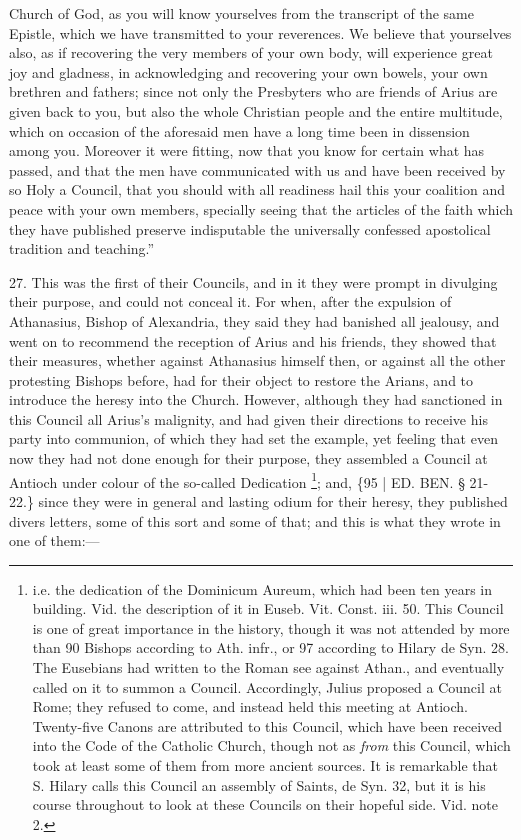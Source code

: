 Church of God, as you will know yourselves from the transcript of the
same Epistle, which we have transmitted to your reverences. We believe
that yourselves also, as if recovering the very members of your
own body, will experience great joy and gladness, in acknowledging and
recovering your own bowels, your own brethren and fathers; since not
only the Presbyters who are friends of Arius are given back to you,
but also the whole Christian people and the entire multitude, which on
occasion of the aforesaid men have a long time been in dissension
among you. Moreover it were fitting, now that you know for certain
what has passed, and that the men have communicated with us and have
been received by so Holy a Council, that you should with all readiness
hail this your coalition and peace with your own members, specially
seeing that the articles of the faith which they have published
preserve indisputable the universally confessed apostolical tradition
and teaching.''

27. This was the first of
their Councils, and in it they were prompt in divulging their purpose,
and could not conceal it. For when, after the expulsion of Athanasius,
Bishop of Alexandria, they said they had banished all jealousy, and
went on to recommend the reception of Arius and his friends, they
showed that their measures, whether against Athanasius himself then,
or against all the other protesting Bishops before, had for their
object to restore the Arians, and to introduce the heresy into the
Church. However, although they had sanctioned in this Council all
Arius's malignity, and had given their directions to receive his party
into communion, of which they had set the example, yet feeling that
even now they had not done enough for their purpose, they assembled a
Council at Antioch under colour of the so-called Dedication \footnote{i.e. the dedication of the Dominicum Aureum, which had been ten years
in building. Vid. the description of it in Euseb. Vit. Const. iii. 50.
This Council is one of great importance in the history, though it was
not attended by more than 90 Bishops according to Ath. infr., or 97
according to Hilary de Syn. 28. The Eusebians had written to the Roman
see against Athan., and eventually called on it to summon a Council.
Accordingly, Julius proposed a Council at Rome; they refused to come,
and instead held this meeting at Antioch. Twenty-five Canons are
attributed to this Council, which have been received into the Code of
the Catholic Church, though not as \emph{from} this Council, which
took at least some of them from more ancient sources. It is remarkable
that S. Hilary calls this Council an assembly of Saints, de Syn. 32,
but it is his course throughout to look at these Councils on their
hopeful side. Vid. note 2.}; and, \{95 | ED.
BEN.
§ 21-22.\} since they were in general and lasting odium for their
heresy, they published divers letters, some of this sort and some of
that; and this is what they wrote in one of them:—

